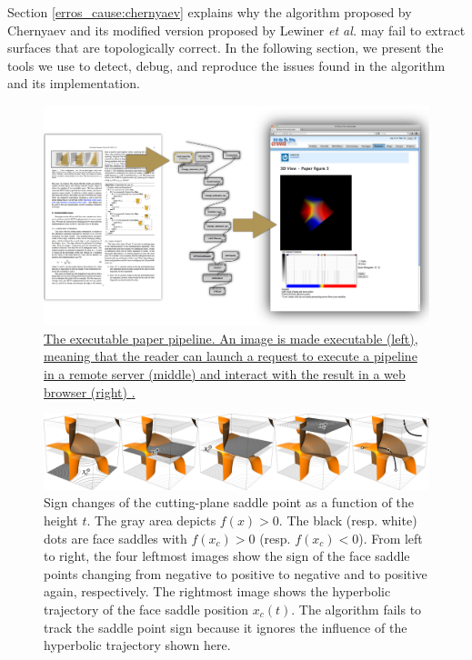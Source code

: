 Section \ref{erros_cause:chernyaev} explains why the algorithm proposed by Chernyaev and its modified version proposed by Lewiner \emph{et al.} may fail to extract surfaces that are topologically correct. In the following section, we present the tools we use to detect, debug, and reproduce the issues found in the \mc{} algorithm and its implementation.

\begin{figure}[b]
     \centering
    \includegraphics[width=0.98\linewidth]{chapter4/figures/executable.png}
     \caption{ \label{fig:executable}\href{http://liscustodio.github.io/C_MC33/index.html}{The executable paper pipeline. An image is made executable (left), meaning that the reader can launch a request to execute a pipeline in a remote server (middle) and interact with the result in a web browser (right) \cite{lisOnline2013}.}}
\end{figure}

\begin{figure}[b]
     \centering
     \includegraphics[width=0.99\linewidth]{chapter4/figures/case13/case13.png}
     \caption{Sign changes of the cutting-plane saddle point as a function of the height $t$. The gray area depicts $f(x) > 0$. The black (resp. white) dots are face saddles with $f(x_c) > 0$ (resp. $f(x_c) < 0$). From left to right, the four leftmost images show the sign of the face saddle points changing from negative to positive to negative and to positive again, respectively. The rightmost image shows the  hyperbolic trajectory of the face saddle position $x_c(t)$. The \mc{} algorithm fails to track the saddle point sign because it ignores the influence of the hyperbolic trajectory shown here. }
     \label{fig:case13saddlesigns}
\end{figure}


